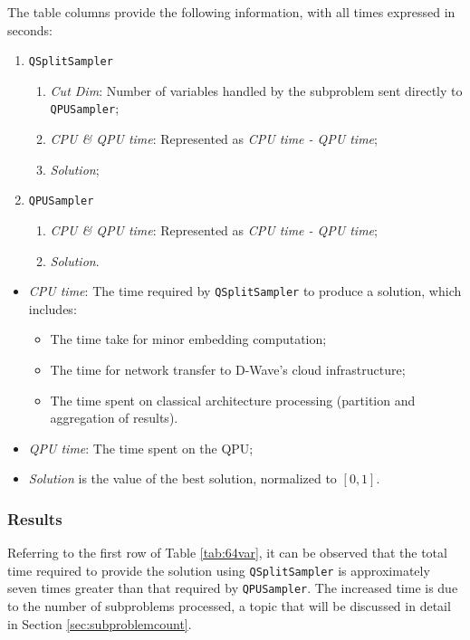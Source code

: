 The table columns provide the following information, with all times expressed in seconds: 
\begin{enumerate}
    \item \texttt{QSplitSampler}
    \begin{enumerate}
        \item \emph{Cut Dim}: Number of variables handled by the subproblem sent directly to \texttt{QPUSampler};
        \item \emph{CPU \& QPU time}: Represented as \emph{CPU time - QPU time};
        \item \emph{Solution};
    \end{enumerate}
    \item \texttt{QPUSampler}
    \begin{enumerate}
        \item \emph{CPU \& QPU time}: Represented as \emph{CPU time - QPU time};
        \item \emph{Solution}.
    \end{enumerate}
\end{enumerate}

\begin{itemize}
    \item \emph{CPU time}: The time required by \texttt{QSplitSampler} to produce a solution, which includes:
    \begin{itemize}
        \item The time take for minor embedding computation;
        \item The time for network transfer to D-Wave's cloud infrastructure;
        \item The time spent on classical architecture processing (partition and aggregation of results).
    \end{itemize}
    \item \emph{QPU time}: The time spent on the QPU;
    \item \emph{Solution} is the value of the best solution, normalized to $[0, 1]$.
\end{itemize}

\subsubsection{Results}

Referring to the first row of Table \ref{tab:64var}, it can be observed that the total time required to provide the solution using \texttt{QSplitSampler} is approximately seven times greater than that required by \texttt{QPUSampler}.
The increased time is due to the number of subproblems processed, a topic that will be discussed in detail in Section \ref{sec:subproblemcount}.

